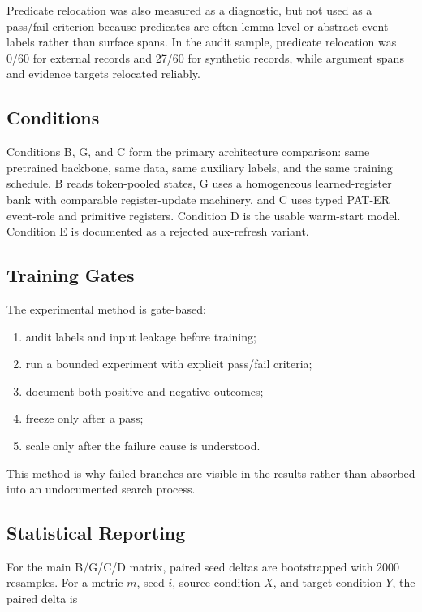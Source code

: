 

Predicate relocation was also measured as a diagnostic, but not used as a
pass/fail criterion because predicates are often lemma-level or abstract event
labels rather than surface spans. In the audit sample, predicate relocation was
0/60 for external records and 27/60 for synthetic records, while argument spans
and evidence targets relocated reliably.

\subsection{Conditions}



Conditions B, G, and C form the primary architecture comparison: same pretrained
\Qwen{} backbone, same data, same auxiliary labels, and the same training
schedule. B reads token-pooled states, G uses a homogeneous learned-register
bank with comparable register-update machinery, and C uses typed PAT-ER
event-role and primitive registers. Condition D is the usable warm-start model.
Condition E is documented as a rejected aux-refresh variant.

\subsection{Training Gates}

The experimental method is gate-based:

\begin{enumerate}
  \item audit labels and input leakage before training;
  \item run a bounded experiment with explicit pass/fail criteria;
  \item document both positive and negative outcomes;
  \item freeze only after a pass;
  \item scale only after the failure cause is understood.
\end{enumerate}

This method is why failed branches are visible in the results rather than
absorbed into an undocumented search process.

\subsection{Statistical Reporting}

For the main B/G/C/D matrix, paired seed deltas are bootstrapped with 2000
resamples. For a metric $m$, seed $i$, source condition $X$, and target
condition $Y$, the paired delta is

